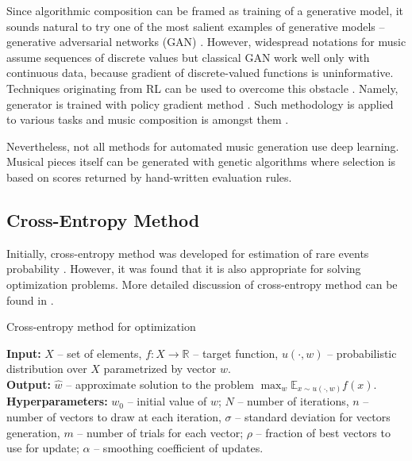 \documentclass{article}
\begin{document}
Since algorithmic composition can be framed as training of a generative model, it sounds natural to try one of the most salient examples of generative models -- generative adversarial networks (GAN) \cite{goodfellow2014gan}. However, widespread notations for music assume sequences of discrete values but classical GAN work well only with continuous data, because gradient of discrete-valued functions is uninformative. Techniques originating from RL can be used to overcome this obstacle \cite{yu2016seqgan,hjelm2017boundary}. Namely, generator is trained with policy gradient method \cite{williams1992simple}. Such methodology is applied to various tasks and music composition is amongst them \cite{limaguimaraes2017objective}.

Nevertheless, not all methods for automated music generation use deep learning. Musical pieces itself can be generated with genetic algorithms \cite{felice2002genorchestra} where selection is based on scores returned by hand-written evaluation rules.

\subsection{Cross-Entropy Method}
\label{subsec:crossentropy}

Initially, cross-entropy method was developed for estimation of rare events probability \cite{rubinstein1997optimization}. However, it was found that it is also appropriate for solving optimization problems. More detailed discussion of cross-entropy method can be found in \cite{boer2005tutorial}.

\begin{algorithm}
	\caption{Cross-entropy method for optimization} \label{alg:crossentropy}
	\textbf{Input:} $X$ -- set of elements, $f: X \to \mathbb{R}$ -- target function, $u(\cdot, w)$ -- probabilistic distribution over $X$ parametrized by vector $w$. \\
	\textbf{Output:} $\hat{w}$ -- approximate solution to the problem $\max_w \mathbb{E}_{x \sim u(\cdot, w)} f(x)$. \\
	\textbf{Hyperparameters:} $w_0$ -- initial value of $w$; $N$ -- number of iterations, $n$ -- number of vectors to draw at each iteration, $\sigma$ -- standard deviation for vectors generation, $m$ -- number of trials for each vector; $\rho$ -- fraction of best vectors to use for update; $\alpha$ -- smoothing coefficient of updates.
	\begin{algorithmic}[1]
		    \ENDFOR
		\ENDFOR
	\end{algorithmic}
\end{algorithm}
\end{document}
